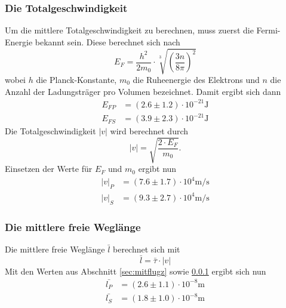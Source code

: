     \subsubsection{Die Totalgeschwindigkeit}
    \label{sec:totgeschw}
      Um die mittlere Totalgeschwindigkeit zu berechnen, muss zuerst die Fermi-Energie bekannt sein. Diese berechnet sich nach
      \begin{equation}
        E_{F} = \frac{h^{2}}{2m_{0}} \cdot \sqrt[3]{\left(\frac{3n}{8 \pi}\right)^{2}}
      \end{equation}
      wobei $h$ die Planck-Konstante, $m_{0}$ die Ruheenergie des Elektrons und $n$ die Anzahl der Ladungsträger pro Volumen bezeichnet. Damit ergibt sich dann
      \begin{align*}
        E_{FP} & = (2.6 \pm 1.2) \cdot 10^{-21} \si{\joule} \\
        E_{FS} & = (3.9 \pm 2.3) \cdot 10^{-21} \si{\joule}
      \end{align*}
      Die Totalgeschwindigkeit $|v|$ wird berechnet durch
      \begin{equation}
        |v| = \sqrt{\frac{2 \cdot E_{F}}{m_{0}}}.
      \end{equation}
      Einsetzen der Werte für $E_{F}$ und $m_{0}$ ergibt nun
      \begin{align*}
        |v|_{P} & = (7.6 \pm 1.7)\cdot 10^{4} \si{\meter\per\second}\\
        |v|_{S} & = (9.3 \pm 2.7)\cdot 10^{4} \si{\meter\per\second}
      \end{align*}
    \subsubsection{Die mittlere freie Weglänge}
      Die mittlere freie Weglänge $\bar{l}$ berechnet sich mit
      \begin{equation}
        \bar{l} = \bar{\tau} \cdot |v|
      \end{equation}
      Mit den Werten aus Abschnitt \ref{sec:mitflugz} sowie \ref{sec:totgeschw} ergibt sich nun
      \begin{align*}
        \bar{l_{P}} & = (2.6 \pm 1.1)\cdot 10^{-8}  \si{\meter} \\
        \bar{l_{S}} & = (1.8 \pm 1.0)\cdot 10^{-8}  \si{\meter}
      \end{align*}

